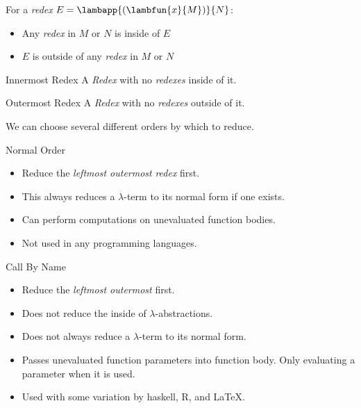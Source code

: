 For a \textit{redex} $E = \lambapp{(\lambfun{x}{M})}{N}$:
\begin{itemize}
	\item Any \textit{redex} in $M$ or $N$ is inside of $E$
	\item $E$ is outside of any \textit{redex} in $M$ or $N$
\end{itemize}
\begin{tcbraster}[raster columns=2,raster equal height]
\begin{definitionbox}{Innermost Redex}
	A \textit{Redex} with no \textit{redexes} inside of it.
\end{definitionbox}
\begin{definitionbox}{Outermost Redex}
	A \textit{Redex} with no \textit{redexes} outside of it.
\end{definitionbox}
\end{tcbraster}
We can choose several different orders by which to reduce.
\begin{definitionbox}{Normal Order}
    \begin{itemize}
        \item Reduce the \textit{leftmost outermost} \textit{redex} first.
        \item This always reduces a $\lambda$-term to its normal form if one exists.
        \item Can perform computations on unevaluated function bodies.
        \item Not used in any programming languages.
    \end{itemize}
\end{definitionbox}
\begin{definitionbox}{Call By Name}
    \begin{itemize}
        \item Reduce the \textit{leftmost outermost} first.
        \item Does not reduce the inside of $\lambda$-abstractions.
        \item Does not always reduce a $\lambda$-term to its normal form.
        \item Passes unevaluated function parameters into function body. Only evaluating a parameter when it is used.
        \item Used with some variation by haskell, R, and \LaTeX.
    \end{itemize}
\end{definitionbox}
